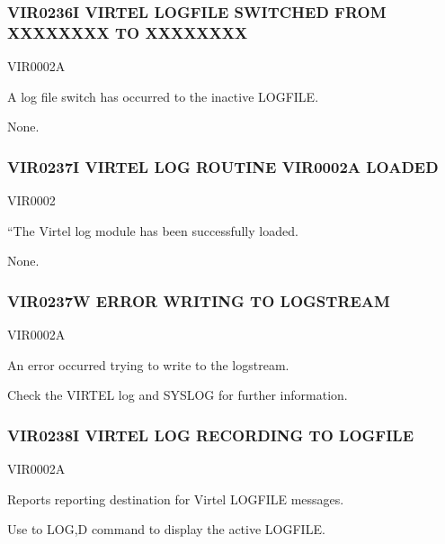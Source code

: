 \documentclass[letterpaper,10pt,english]{sphinxmanual}
\begin{document}
\subsubsection{VIR0236I VIRTEL LOGFILE SWITCHED FROM XXXXXXXX TO XXXXXXXX}
\label{\detokenize{messages:vir0236i-virtel-logfile-switched-from-xxxxxxxx-to-xxxxxxxx}}\begin{description}
\sphinxAtStartPar
VIR0002A

\sphinxAtStartPar
A log file switch has occurred to the inactive LOGFILE.

\sphinxAtStartPar
None.

\end{description}


\subsubsection{VIR0237I VIRTEL LOG ROUTINE VIR0002A LOADED}
\label{\detokenize{messages:vir0237i-virtel-log-routine-vir0002a-loaded}}\begin{description}
\sphinxAtStartPar
VIR0002

\sphinxAtStartPar
“The Virtel log module has been successfully loaded.

\sphinxAtStartPar
None.

\end{description}


\subsubsection{VIR0237W ERROR WRITING TO LOGSTREAM}
\label{\detokenize{messages:vir0237w-error-writing-to-logstream}}\begin{description}
\sphinxAtStartPar
VIR0002A

\sphinxAtStartPar
An error occurred trying to write to the logstream.

\sphinxAtStartPar
Check the VIRTEL log and SYSLOG for further information.

\end{description}


\subsubsection{VIR0238I VIRTEL LOG RECORDING TO LOGFILE}
\label{\detokenize{messages:vir0238i-virtel-log-recording-to-logfile}}\begin{description}
\sphinxAtStartPar
VIR0002A

\sphinxAtStartPar
Reports reporting destination for Virtel LOGFILE messages.

\sphinxAtStartPar
Use to LOG,D command to display the active LOGFILE.

\end{description}
\end{document}
